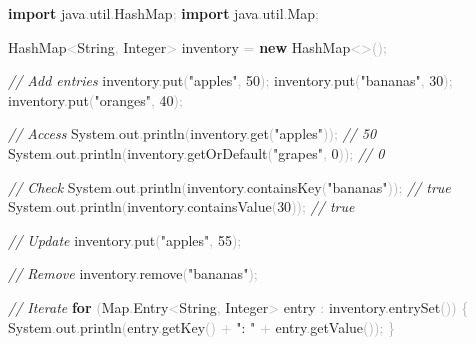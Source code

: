 \documentclass[
  justified,
  openright,
]{tufte-book}
\newcommand{\KeywordTok}[1]{\textcolor{CodeKeyword}{\textbf{#1}}}  %
\newcommand{\StringTok}[1]{\textcolor{CodeString}{#1}}              %
\newcommand{\CommentTok}[1]{\textcolor{CodeComment}{\textit{#1}}}  %
\newcommand{\CodeNumTok}[1]{\textcolor{CodeNumber}{#1}}             %
\newcommand{\CodeFuncTok}[1]{\textcolor{CodeKeyword}{#1}}           %
\newcommand{\CodeAccentTok}[1]{\textcolor{CodeAccent}{#1}}          %
\newcommand{\OperatorTok}[1]{\textcolor{DarkGray}{#1}}              %
\newenvironment{Shaded}{%
  \begin{mdframed}[style=TufteCode]%
}{%
  \end{mdframed}%
}
\begin{document}
\begin{Shaded}
\begin{Highlighting}[]
\KeywordTok{import} \CodeAccentTok{java}\OperatorTok{.}\CodeAccentTok{util}\OperatorTok{.}\CodeAccentTok{HashMap}\OperatorTok{;}
\KeywordTok{import} \CodeAccentTok{java}\OperatorTok{.}\CodeAccentTok{util}\OperatorTok{.}\CodeAccentTok{Map}\OperatorTok{;}
 
HashMap\OperatorTok{\textless{}}String\OperatorTok{,} Integer\OperatorTok{\textgreater{}} inventory \OperatorTok{=} \KeywordTok{new} HashMap\OperatorTok{\textless{}\textgreater{}();}
 
\CommentTok{// Add entries}
inventory\OperatorTok{.}\CodeFuncTok{put}\OperatorTok{(}\StringTok{"apples"}\OperatorTok{,} \CodeNumTok{50}\OperatorTok{);}
inventory\OperatorTok{.}\CodeFuncTok{put}\OperatorTok{(}\StringTok{"bananas"}\OperatorTok{,} \CodeNumTok{30}\OperatorTok{);}
inventory\OperatorTok{.}\CodeFuncTok{put}\OperatorTok{(}\StringTok{"oranges"}\OperatorTok{,} \CodeNumTok{40}\OperatorTok{);}
 
\CommentTok{// Access}
System\OperatorTok{.}\CodeFuncTok{out}\OperatorTok{.}\CodeFuncTok{println}\OperatorTok{(}inventory\OperatorTok{.}\CodeFuncTok{get}\OperatorTok{(}\StringTok{"apples"}\OperatorTok{));}           \CommentTok{// 50}
System\OperatorTok{.}\CodeFuncTok{out}\OperatorTok{.}\CodeFuncTok{println}\OperatorTok{(}inventory\OperatorTok{.}\CodeFuncTok{getOrDefault}\OperatorTok{(}\StringTok{"grapes"}\OperatorTok{,} \CodeNumTok{0}\OperatorTok{));} \CommentTok{// 0}
 
\CommentTok{// Check}
System\OperatorTok{.}\CodeFuncTok{out}\OperatorTok{.}\CodeFuncTok{println}\OperatorTok{(}inventory\OperatorTok{.}\CodeFuncTok{containsKey}\OperatorTok{(}\StringTok{"bananas"}\OperatorTok{));}   \CommentTok{// true}
System\OperatorTok{.}\CodeFuncTok{out}\OperatorTok{.}\CodeFuncTok{println}\OperatorTok{(}inventory\OperatorTok{.}\CodeFuncTok{containsValue}\OperatorTok{(}\CodeNumTok{30}\OperatorTok{));}         \CommentTok{// true}
 
\CommentTok{// Update}
inventory\OperatorTok{.}\CodeFuncTok{put}\OperatorTok{(}\StringTok{"apples"}\OperatorTok{,} \CodeNumTok{55}\OperatorTok{);}
 
\CommentTok{// Remove}
inventory\OperatorTok{.}\CodeFuncTok{remove}\OperatorTok{(}\StringTok{"bananas"}\OperatorTok{);}
 
\CommentTok{// Iterate}
\KeywordTok{for} \OperatorTok{(}Map\OperatorTok{.}\CodeFuncTok{Entry}\OperatorTok{\textless{}}String\OperatorTok{,} Integer\OperatorTok{\textgreater{}} entry \OperatorTok{:} inventory\OperatorTok{.}\CodeFuncTok{entrySet}\OperatorTok{())} \OperatorTok{\{}
    System\OperatorTok{.}\CodeFuncTok{out}\OperatorTok{.}\CodeFuncTok{println}\OperatorTok{(}entry\OperatorTok{.}\CodeFuncTok{getKey}\OperatorTok{()} \OperatorTok{+} \StringTok{": "} \OperatorTok{+} entry\OperatorTok{.}\CodeFuncTok{getValue}\OperatorTok{());}
\OperatorTok{\}}
 

\end{Highlighting}
\end{Shaded}
\end{document}
